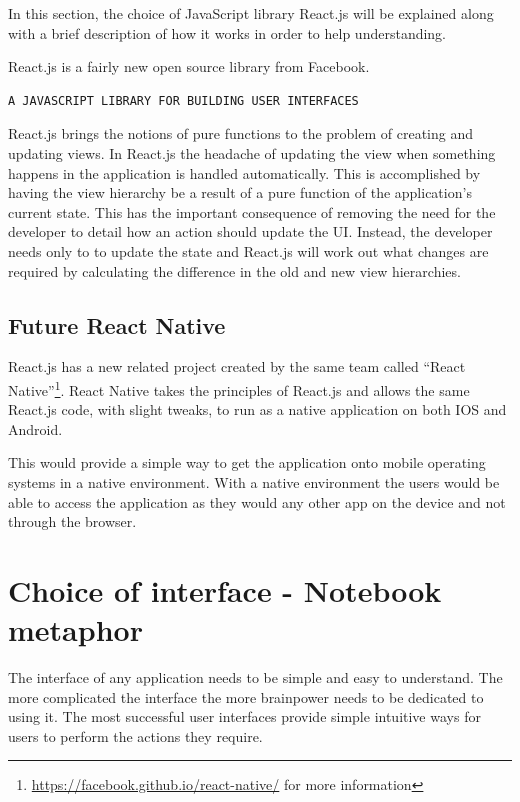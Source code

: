 In this section, the choice of JavaScript library React.js will be explained
along with a brief description of how it works in order to help understanding.

React.js is a fairly new open source library from Facebook.

\begin{verbatim}
A JAVASCRIPT LIBRARY FOR BUILDING USER INTERFACES
\end{verbatim}\cite{reactjs}

React.js brings the notions of pure functions to the problem of creating and
updating views. In React.js the headache of updating the view when something
happens in the application is handled automatically. This is accomplished by
having the view hierarchy be a result of a pure function of the application's
current state. This has the important consequence of removing the need for the
developer to detail how an action should update the UI. Instead, the developer
needs only to to update the state and React.js will work out what changes are
required by calculating the difference in the old and new view hierarchies.

\subsection{Future React Native}\label{future-react-native}

React.js has a new related project created by the same team called ``React
Native''\footnote{\url{https://facebook.github.io/react-native/} for more
information}. React Native takes the principles of React.js and allows the same
React.js code, with slight tweaks, to run as a native application on both IOS
and Android.

This would provide a simple way to get the application onto mobile operating systems in a
native environment. With a native environment the users would be able to access the application
as they would any other app on the device and not through the browser.

\section{Choice of interface - Notebook
metaphor}\label{choice-of-interface---notebook-metaphor}

The interface of any application needs to be simple and easy to
understand. The more complicated the interface the more brainpower needs
to be dedicated to using it. The most successful user interfaces provide
simple intuitive ways for users to perform the actions they require.

